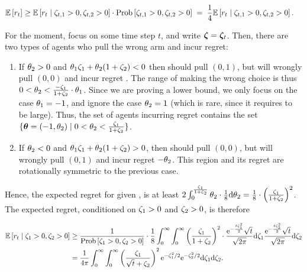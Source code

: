 \begin{align*}
\Expect{\Regret{t}} 
  & \geq \ExpectC{\Regret{t}}{\Noise[t]{1} > 0, \Noise[t]{2} > 0}
         \cdot \Prob{\Noise[t]{1} > 0, \Noise[t]{2} > 0}
  \; = \; \quarter \ExpectC{\Regret{t}}{\Noise[t]{1} > 0, \Noise[t]{2} > 0}.
\end{align*}

For the moment, focus on some time step $t$,
and write $\NoiseV = \NoiseV[t]$.
Then, there are two types of agents who pull the wrong arm and incur
regret:
\begin{enumerate}
\item If $\Ag{2} > 0$ and $\Ag{1} \Noise{1} + \Ag{2} (1+\Noise{2}) < 0$
then \AgV should pull $(0,1)$,
but will wrongly pull $(0,0)$ and incur regret .
The range of \AgV making the wrong choice is thus
$0 < \Ag{2} < \frac{- \Noise{1}}{1+\Noise{2}} \cdot \Ag{1}$.
Since we are proving a lower bound, we only focus on the
case $\Ag{1} = -1$, and ignore the case $\Ag{2} = 1$
(which is rare, since it requires  to be large).
Thus, the set of agents incurring regret contains the set
$\Set{\AgV = (-1, \Ag{2})}{0 < \Ag{2} < \frac{\Noise{1}}{1+\Noise{2}}}$.


\item If $\Ag{2} < 0$ and $\Ag{1} \Noise{1} + \Ag{2} (1+\Noise{2}) > 0$,
then \AgV should pull $(0,0)$,
but will wrongly pull $(0,1)$ and incur regret $-\Ag{2}$.
This region and its regret are rotationally symmetric to the previous
case.
\end{enumerate}

Hence, the expected regret for given ,  is at least
$2 \int_0^{\frac{\Noise{1}}{1+\Noise{2}}}
  \Ag{2} \cdot \frac{1}{8} \dd \Ag{2}
=
\frac{1}{8} \cdot \left(\frac{\Noise{1}}{1+\Noise{2}}\right)^2$.
The expected regret, conditioned on
$\Noise{1} > 0$ and $\Noise{2} > 0$, is therefore

\begin{align*}
\ExpectC{\Regret{t}}{\Noise{1} > 0, \Noise{2} > 0}
 & \geq \frac{1}{\Prob{\Noise{1}>0,\Noise{2}>0}} \cdot \frac{1}{8}
    \int_{0}^{\infty} \int_{0}^{\infty}
    \left( \frac{\Noise{1}}{1+\Noise{2}} \right)^2 \cdot
    \frac{\e^{-\frac{t \Noise{1}^2}{2}} \sqrt{t}}{\sqrt{2\pi}} \dd\Noise{1}
    \frac{\e^{-\frac{t \Noise{2}^2}{2}} \sqrt{t}}{\sqrt{2\pi}} \dd\Noise{2} \\
 & = \frac{1}{4\pi} \int_{0}^{\infty} \int_{0}^{\infty}
   \left( \frac{\Noise{1}}{\sqrt{t}+\Noise{2}} \right)^2
   \e^{-\Noise{1}^2/2} \e^{-\Noise{2}^2/2} \dd \Noise{1} \dd \Noise{2}.
\end{align*}

